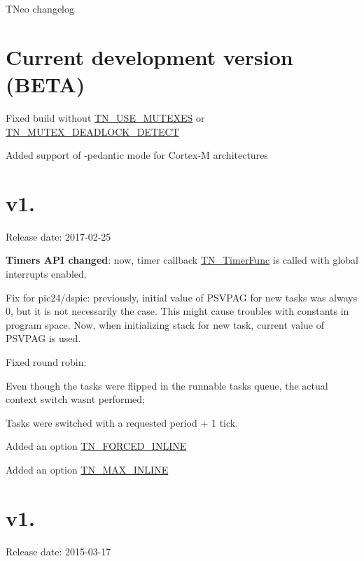 T\+Neo changelog\hypertarget{changelog_changelog_current}{}\section{Current development version (\+B\+E\+T\+A)}\label{changelog_changelog_current}

\begin{DoxyItemize}
\item Fixed build without {\ttfamily \hyperlink{tn__cfg__default_8h_a7ce674edab5345c4b8d2ec251eea18eb}{T\+N\+\_\+\+U\+S\+E\+\_\+\+M\+U\+T\+E\+X\+ES}} or {\ttfamily \hyperlink{tn__cfg__default_8h_a6ed3ec7b0d4338e7f60dde86b7ea5fa4}{T\+N\+\_\+\+M\+U\+T\+E\+X\+\_\+\+D\+E\+A\+D\+L\+O\+C\+K\+\_\+\+D\+E\+T\+E\+CT}}
\item Added support of {\ttfamily -\/pedantic} mode for Cortex-\/M architectures
\end{DoxyItemize}\hypertarget{changelog_changelog_v1_08}{}\section{v1.}\label{changelog_changelog_v1_08}
Release date\+: 2017-\/02-\/25


\begin{DoxyItemize}
\item {\bfseries Timers A\+PI changed}\+: now, timer callback {\ttfamily \hyperlink{tn__timer_8h_a3139b6e571f7bd3d304a7bb87b5b2459}{T\+N\+\_\+\+Timer\+Func}} is called with global interrupts enabled.
\item Fix for pic24/dspic\+: previously, initial value of P\+S\+V\+P\+AG for new tasks was always 0, but it is not necessarily the case. This might cause troubles with constants in program space. Now, when initializing stack for new task, current value of P\+S\+V\+P\+AG is used.
\item Fixed round robin\+:
\begin{DoxyItemize}
\item Even though the tasks were flipped in the runnable tasks queue, the actual context switch wasn\textquotesingle{}t performed;
\item Tasks were switched with a requested period + 1 tick.
\end{DoxyItemize}
\item Added an option {\ttfamily \hyperlink{tn__cfg__default_8h_a55cf98b6d6de554b433f497f62c2b363}{T\+N\+\_\+\+F\+O\+R\+C\+E\+D\+\_\+\+I\+N\+L\+I\+NE}}
\item Added an option {\ttfamily \hyperlink{tn__cfg__default_8h_a50a44e397e61bf00e33ebb25ac417c56}{T\+N\+\_\+\+M\+A\+X\+\_\+\+I\+N\+L\+I\+NE}}
\end{DoxyItemize}\hypertarget{changelog_changelog_v1_07}{}\section{v1.}\label{changelog_changelog_v1_07}
Release date\+: 2015-\/03-\/17


